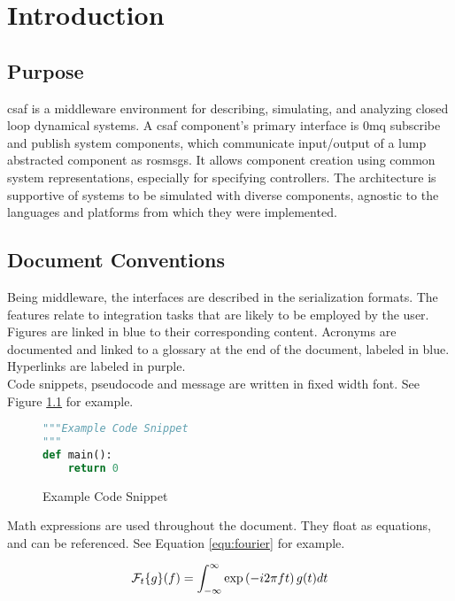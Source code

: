 \chapter{Introduction}

\section{Purpose}
\acrshort{csaf} is a middleware environment for describing, simulating, and analyzing closed loop dynamical 
systems. A \acrshort{csaf} component's primary interface is \acrlong{0mq} subscribe and publish system 
components, which communicate input/output of a lump abstracted component as \acrshort{ros}msgs. It 
allows component creation using common system representations, especially for specifying controllers. The 
architecture is supportive of systems to be simulated with diverse components, agnostic to the languages 
and platforms from which they were implemented.


\section{Document Conventions}

Being middleware, the interfaces are described in the serialization formats. The features 
relate to integration tasks that are likely to be employed by the user. \\

Figures are linked in blue to their corresponding content. Acronyms are documented and linked to a glossary 
at the end of the document, labeled in blue. Hyperlinks are labeled in purple. \\

Code snippets, pseudocode and message are written in fixed width font. See Figure \ref{code:example} for 
example.

\begin{figure}[h]
\centering
\begin{lstlisting}[language=Python]
"""Example Code Snippet
"""
def main():
	return 0
\end{lstlisting}
\caption{Example Code Snippet}
\label{code:example}
\end{figure}

Math expressions are used throughout the document. They float as equations, and can be referenced. See 
Equation \ref{equ:fourier} for example.

\begin{equation} \label{equ:fourier}
\mathcal{F}_t\{g\}(f) = \int_{-\infty}^{\infty} \exp\left({-i 2\pi f t}\right) g(t) dt \\
\end{equation}



